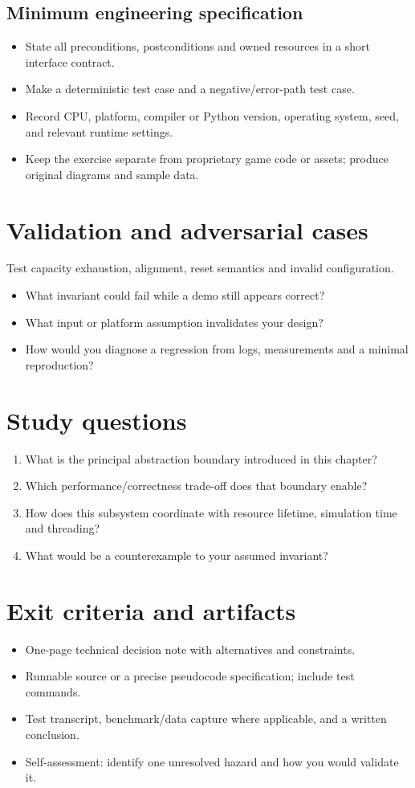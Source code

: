 \documentclass[11pt,letterpaper]{article}
\begin{document}
\subsection{Minimum engineering specification}
\begin{itemize}
\item State all preconditions, postconditions and owned resources in a short interface contract.
\item Make a deterministic test case and a negative/error-path test case.
\item Record CPU, platform, compiler or Python version, operating system, seed, and relevant runtime settings.
\item Keep the exercise separate from proprietary game code or assets; produce original diagrams and sample data.
\end{itemize}
\section{Validation and adversarial cases}
Test capacity exhaustion, alignment, reset semantics and invalid configuration.

\begin{itemize}
\item What invariant could fail while a demo still appears correct?
\item What input or platform assumption invalidates your design?
\item How would you diagnose a regression from logs, measurements and a minimal reproduction?
\end{itemize}
\section{Study questions}
\begin{enumerate}
\item What is the principal abstraction boundary introduced in this chapter?
\item Which performance/correctness trade-off does that boundary enable?
\item How does this subsystem coordinate with resource lifetime, simulation time and threading?
\item What would be a counterexample to your assumed invariant?
\end{enumerate}
\section{Exit criteria and artifacts}
\begin{itemize}
\item One-page technical decision note with alternatives and constraints.
\item Runnable source or a precise pseudocode specification; include test commands.
\item Test transcript, benchmark/data capture where applicable, and a written conclusion.
\item Self-assessment: identify one unresolved hazard and how you would validate it.
\end{itemize}
\end{document}
